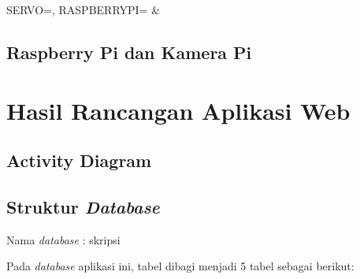 \begin{atable}
    \caption{Rangkaian pin Servo ke Raspberry Pi}
    \label{table:tableServo}
        {
            SERVO=\SERVO, 
            RASPBERRYPI=\RASPBERRYPI}
        {
            \SERVO & 
            \RASPBERRYPI}
\end{atable}

\subsection{Raspberry Pi dan Kamera Pi}


\section{Hasil Rancangan Aplikasi Web}

\subsection{Activity Diagram}

\subsection{Struktur \textit{Database}}
Nama \textit{database} : skripsi

Pada \textit{database} aplikasi ini, tabel dibagi menjadi 5 tabel sebagai berikut:

